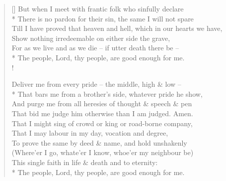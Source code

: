 \documentclass[MAIN]{subfiles}
\begin{document}
\begin{verse}[\versewidth]
But when I meet with frantic folk who sinfully declare\\*
There is no pardon for their sin, the same I will not spare\\
Till I have proved that heaven and hell, which in our hearts we have,\\
Show nothing irredeemable on either side the grave,\\
For as we live and as we die -- if utter death there be --\\*
The people, Lord, thy people, are good enough for me.\\!

Deliver me from every pride -- the middle, high \& low --\\*
That bars me from a brother's side, whatever pride he show,\\
And purge me from all heresies of thought \& speech \& pen\\
That bid me judge him otherwise than I am judged. Amen.\\
That I might sing of crowd or king or road-borne company,\\
That I may labour in my day, vocation and degree,\\
To prove the same by deed \& name, and hold unshakenly\\
(Where'er I go, whate'er I know, whoe'er my neighbour be)\\
This single faith in life \& death and to eternity:\\*
The people, Lord, thy people, are good enough for me.
\end{verse}
\end{document}
